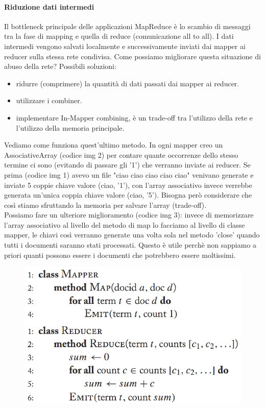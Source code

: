 \documentclass{article}
\begin{document}
\begin{appendices}
\paragraph{Riduzione dati intermedi}
Il bottleneck principale delle applicazioni MapReduce è lo scambio di messaggi tra la fase di mapping e quella di reduce (comunicazione all to all). I dati intermedi vengono salvati localmente e successivamente inviati dai mapper ai reducer sulla stessa rete condivisa. Come possiamo migliorare questa situazione di abuso della rete? Possibili soluzioni:
\begin{itemize}
    \item ridurre (comprimere) la quantità di dati passati dai mapper ai reducer.
    \item utilizzare i combiner.  
    \item implementare In-Mapper combining, è un trade-off tra l'utilizzo della rete e l'utilizzo della memoria principale.
\end{itemize}
Vediamo come funziona quest'ultimo metodo.
In ogni mapper creo un AssociativeArray (codice img 2) per contare quante occorrenze dello stesso termine ci sono (evitando di passare gli '1') che verranno inviate ai reducer. Se prima (codice img 1) avevo un file "ciao ciao ciao ciao ciao" venivano generate e inviate 5 coppie chiave valore (ciao, '1'), con l'array associativo invece verrebbe generata un'unica coppia chiave valore (ciao, '5'). Bisogna però considerare che così stiamo sfruttando la memoria per salvare l'array (trade-off). \\
Possiamo fare un ulteriore miglioramento (codice img 3): invece di memorizzare l'array associativo al livello del metodo di map lo facciamo al livello di classe mapper, le chiavi così verranno generate una volta sola nel metodo 'close' quando tutti i documenti saranno stati processati. Questo è utile perchè non sappiamo a priori quanti possono essere i documenti che potrebbero essere moltissimi. 
\begin{figure}[H]
    \centering
    \includegraphics[scale=0.5]{img/In_mapper1.PNG}

\end{figure}
\end{appendices}
\end{document}
